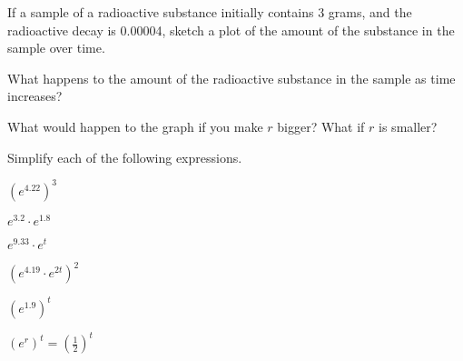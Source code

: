 \begin{problem}
\begin{subproblem}
  \item If a sample of a radioactive substance initially contains 3
    grams, and the radioactive decay is 0.00004, sketch a plot of the
    amount of the substance in the sample over time.
    
    \vfill

  \item What happens to the amount of the radioactive substance in the
    sample as time increases?
    
    \vspace{3em}

  \item What would happen to the graph if you make $r$ bigger? What if
    $r$ is smaller?

    \vspace{3em}


  \end{subproblem}

\clearpage

\item Simplify each of the following expressions.
  \begin{subproblem}
  \item ${\displaystyle \left(e^{4.22}\right)^3}$
    \vfill
  \item ${\displaystyle e^{3.2}\cdot e^{1.8}}$
    \vfill
  \item ${\displaystyle e^{9.33}\cdot e^{t}}$
    \vfill
  \item ${\displaystyle \left(e^{4.19}\cdot e^{2t}\right)^2}$
    \vfill
  \item ${\displaystyle \left(e^{1.9}\right)^t}$
    \vfill
  \item ${\displaystyle \left(e^r\right)^t = \left( \frac{1}{2} \right)^t}$
    \vfill
  \end{subproblem}

\clearpage


\end{problem}
